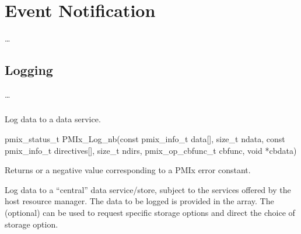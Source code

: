 \chapter{Event Notification}
\label{chap:api_event}

\ldots


\section{Logging}
\label{chap:api_event:logging}

\ldots

\subsection{}

\summary

Log data to a data service.

\format

\cspecificstart
\begin{codepar}
pmix_status_t
PMIx_Log_nb(const pmix_info_t data[], size_t ndata,
            const pmix_info_t directives[], size_t ndirs,
            pmix_op_cbfunc_t cbfunc, void *cbdata)
\end{codepar}
\cspecificend

\begin{arglist}
\end{arglist}

Returns  or a negative value corresponding to a PMIx error constant.

\descr

Log data to a ``central'' data service/store, subject to the services offered by the host resource manager.
The data to be logged is provided in the  array.
The (optional)  can be used to request specific storage options and direct the choice of storage option.

